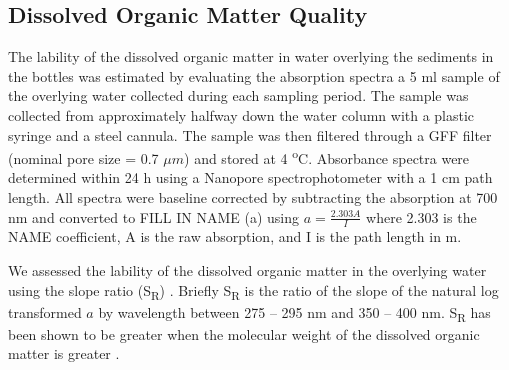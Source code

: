 \subsection{Dissolved Organic Matter Quality}

The lability of the dissolved organic matter in water overlying the sediments in the bottles was estimated by evaluating the absorption spectra a 5 ml sample of the overlying water collected during each sampling period. The sample was collected from approximately halfway down the water column with a plastic syringe and a steel cannula. The sample was then filtered through a GFF filter (nominal pore size = 0.7 $\mu m$) and stored at 4 \textsuperscript{o}C. Absorbance spectra were determined within 24 h using a Nanopore spectrophotometer with a 1 cm path length. All spectra were baseline corrected by subtracting the absorption at 700 nm and converted to FILL IN NAME (a) using $a = \frac{2.303A}{I}$ where 2.303 is the NAME coefficient, A is the raw absorption, and I is the path length in m.

We assessed the lability of the dissolved organic matter in the overlying water using the slope ratio (S\textsubscript{R}) \cite{helmsetal2008}. Briefly S\textsubscript{R} is the ratio of the slope of the natural log transformed $a$ by wavelength between 275 -- 295 nm and 350 -- 400 nm. S\textsubscript{R} has been shown to be greater when the molecular weight of the dissolved organic matter is greater \cite{helmsetal2008}. 
